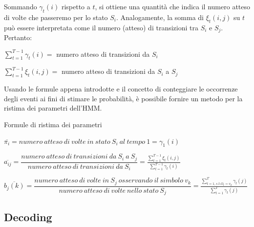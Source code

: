 \documentclass[slidestop,mathserif,red]{beamer}
\begin{document}
\begin{frame}
 \begin{block}{}
  Sommando $\gamma_{t}(i)$ rispetto a $t$, si ottiene una quantit\`a che indica il numero atteso di volte che passeremo per lo stato $S_{i}$. Analogamente, la somma di $\xi_{t}(i,j)$ su $t$ pu\`o essere interpretata come il numero (atteso) di transizioni tra $S_{i}$ e $S_{j}$. Pertanto:
\begin{center}
 $\sum_{t=1}^{T-1}\gamma_{t}(i) =$ numero atteso di transizioni da $S_{i}$
\end{center}
\begin{center}
 $\sum_{t=1}^{T-1}\xi_{t}(i,j) =$ numero atteso di transizioni da $S_{i}$ a $S_{j}$
\end{center}
 \end{block}

\begin{block}{}
 Usando le formule appena introdotte e il concetto di conteggiare le occorrenze degli eventi ai fini di stimare le probabilit\`a, \`e possibile fornire un metodo per la ristima dei parametri dell'HMM.
\end{block}
\end{frame}

\begin{frame}
 \begin{block}{Formule di ristima dei parametri}
 \begin{center}
$\overline{\pi_{i}} = numero\ atteso\ di\ volte\ in\ stato\ S_{i}\ al\ tempo\ 1 = \gamma_{1}(i)$
\end{center}

\begin{center}
 $\overline{a_{ij}} = \dfrac{numero\ atteso\ di\ transizioni\ da\ S_{i}\ a\ S_{j}}{numero\ atteso\ di\ transizioni\ da\ S_{i}} = \frac{\sum_{t=1}^{T-1}\xi_{t}(i,j)}{\sum_{t=1}^{T-1}\gamma_{t}(i)}$
\end{center}

\begin{center}
 $ \overline{b_{j}(k)} = \dfrac{numero\ atteso\ di\ volte\ in\ S_{j}\ osservando\ il\ simbolo\ v_{k}}{numero\ atteso\ di\ volte\ nello\ stato\ S_{j}} = \frac{\sum_{t=1, s.t. O_{t} = v_{k}}^{T}\gamma_{t}(j)}{\sum_{t=1}^{T}\gamma_{t}(j)}$
\end{center}

 \end{block}
\end{frame}


\subsection{Decoding}
\end{document}
